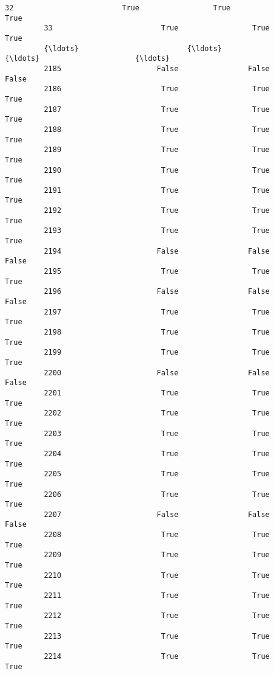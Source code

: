 \documentclass[11pt]{llncs}
\begin{document}
\begin{Verbatim}[commandchars=\\\{\}]
         32                         True                 True                     True   
         33                         True                 True                     True   
         {\ldots}                         {\ldots}                  {\ldots}                      {\ldots}   
         2185                      False                False                    False   
         2186                       True                 True                     True   
         2187                       True                 True                     True   
         2188                       True                 True                     True   
         2189                       True                 True                     True   
         2190                       True                 True                     True   
         2191                       True                 True                     True   
         2192                       True                 True                     True   
         2193                       True                 True                     True   
         2194                      False                False                    False   
         2195                       True                 True                     True   
         2196                      False                False                    False   
         2197                       True                 True                     True   
         2198                       True                 True                     True   
         2199                       True                 True                     True   
         2200                      False                False                    False   
         2201                       True                 True                     True   
         2202                       True                 True                     True   
         2203                       True                 True                     True   
         2204                       True                 True                     True   
         2205                       True                 True                     True   
         2206                       True                 True                     True   
         2207                      False                False                    False   
         2208                       True                 True                     True   
         2209                       True                 True                     True   
         2210                       True                 True                     True   
         2211                       True                 True                     True   
         2212                       True                 True                     True   
         2213                       True                 True                     True   
         2214                       True                 True                     True   
         

\end{Verbatim}
\end{document}
